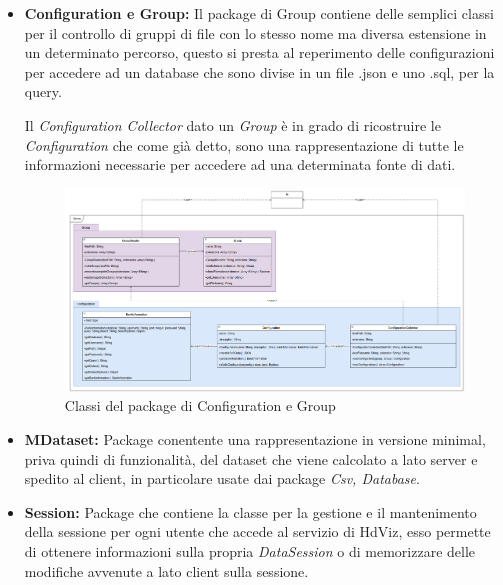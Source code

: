 \documentclass[../manuale_sviluppatore.tex]{subfiles}
\begin{document}
\begin{itemize}
	\newpage
	\item \textbf{Configuration e Group:} Il package di Group contiene delle semplici classi per il controllo di gruppi
	di file con lo stesso nome ma diversa estensione in un determinato percorso, questo si presta al reperimento delle 
	configurazioni per accedere ad un database che sono divise in un file .json e uno .sql, per la query. 

	Il \emph{Configuration Collector} dato un \emph{Group} è in grado di ricostruire le \emph{Configuration} che 
	come già detto, sono una rappresentazione di tutte le informazioni necessarie per accedere ad una determinata fonte di dati.
	
	\begin{figure}[H]
		\centering
		\includegraphics[width=18cm]{src/img/server-group.png}
		\caption{Classi del package di Configuration e Group}
	\end{figure}

	\item \textbf{MDataset:} Package conentente una rappresentazione in versione minimal, priva quindi di funzionalità, del dataset
	che viene calcolato a lato server e spedito al client, in particolare usate dai package \emph{Csv, Database}.

	\item \textbf{Session:} Package che contiene la classe per la gestione e il mantenimento della sessione per ogni utente che 
	accede al servizio di HdViz, esso permette di ottenere informazioni sulla propria \emph{DataSession} o di memorizzare delle 
	modifiche avvenute a lato client sulla sessione.

\end{itemize}
\end{document}
